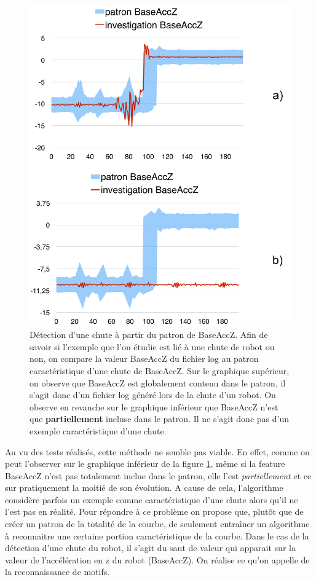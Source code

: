 \begin{figure}[h]
	\centering\includegraphics[width=12cm]{images/patron_comp.png}
	\caption[Détection d'une chute à partir du patron de BaseAccZ]{Détection d'une chute à partir du patron de BaseAccZ. Afin de savoir si l'exemple que l'on étudie est lié à une chute de robot ou non, on compare la valeur BaseAccZ du fichier log au patron caractéristique d'une chute de BaseAccZ. Sur le graphique supérieur, on observe que BaseAccZ est globalement contenu dans le patron, il s'agit donc d'un fichier log généré lors de la chute d'un robot. On observe en revanche sur le graphique inférieur que BaseAccZ n'est que \textbf{partiellement} incluse dans le patron. Il ne s'agit donc pas d'un exemple caractéristique d'une chute. }
	\label{fig:Détection d'une chute à partir du patron de BaseAccZ}
\end{figure}

Au vu des tests réalisés, cette méthode ne semble pas viable. En effet, comme on peut l'observer sur le graphique inférieur de la figure \ref{fig:Détection d'une chute à partir du patron de BaseAccZ}, même si la feature BaseAccZ n'est pas totalement inclue dans le patron, elle l'est \emph{partiellement} et ce sur pratiquement la moitié de son évolution. A cause de cela,  l'algorithme considère parfois un exemple comme caractéristique d'une chute alors qu'il ne l'est pas en réalité. Pour répondre à ce problème on propose que, plutôt que de créer un patron de la totalité de la courbe, de seulement entraîner un algorithme à reconnaitre une certaine portion caractéristique de la courbe. Dans le cas de la détection d'une chute du robot, il s'agit du saut de valeur qui apparait sur la valeur de l'accélération en z du robot (BaseAccZ). On réalise ce qu'on appelle de la reconnaissance de motifs. 

